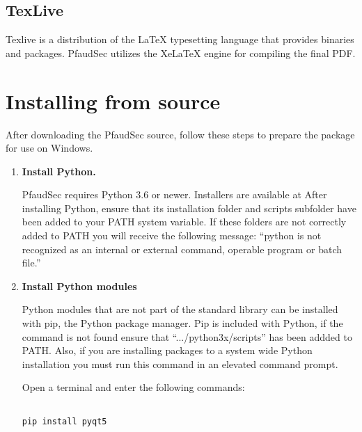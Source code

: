 \documentclass[14pt]{article}
\newcommand{\chref}[3][black]{\href{#2}{\color{#1}{#3}}}%
\begin{document}
\begin{flushleft}
	\subsection{TexLive}
Texlive is a distribution of the \LaTeX\xspace typesetting language that provides binaries and packages.
PfaudSec utilizes the XeLaTeX engine for compiling the final PDF.

\section{Installing from source}
\label{sec:install}

After downloading the PfaudSec source, follow these steps to prepare the package for use on Windows.

\begin{enumerate}

\item \textbf{Install Python.}

PfaudSec requires Python 3.6 or newer.
Installers are available at
\chref[pfblue]{https://www.python.org/downloads/}{https://www.python.org/downloads/}
After installing Python, ensure that its installation folder and scripts subfolder have been added to your PATH system variable.
If these folders are not correctly added to PATH you will receive the following message: 
``python is not recognized as an internal or external command, operable program or batch file.''

\item \textbf{Install Python modules}

Python modules that are not part of the standard library can be installed with pip, the Python package manager.
Pip is included with Python, if the command is not found ensure that ``.../python3x/scripts'' has been addded to PATH.
Also, if you are installing packages to a system wide Python installation you must run this command in an elevated command prompt.

Open a terminal and enter the following commands:

\begin{tcolorbox}[boxrule=0.5pt, colback=backgrey, colframe=bordergrey, sharpish corners] 
\begin{verbatim}

pip install pyqt5

\end{verbatim}
\end{tcolorbox}

\begin{tcolorbox}[boxrule=0.5pt, colback=backgrey, colframe=bordergrey, sharpish corners] 
\begin{verbatim}


\end{verbatim}
\end{tcolorbox}
\end{enumerate}
\end{flushleft}
\end{document}
